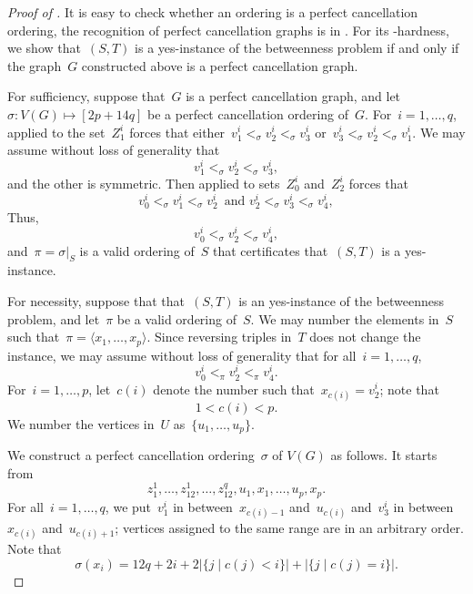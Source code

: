\documentclass[a4paper,cleveref, autoref, 11pt, fleqn, thm-restate]{article}
\theoremstyle{plain}
\begin{document}
\begin{proof}[Proof of ]
  It is easy to check whether an ordering is a perfect cancellation ordering, the recognition of perfect cancellation graphs is in \NP.  For its \NP-hardness, we show that~$(S, T)$ is a yes-instance of the betweenness problem if and only if the graph~$G$ constructed above is a perfect cancellation graph.

  For sufficiency, suppose that~$G$ is a perfect cancellation graph, and let~$\sigma: V(G)\mapsto [2 p + 14 q]$ be a perfect cancellation ordering of~$G$.
  For~$i = 1, \ldots, q$,  applied to the set~$Z^{i}_{1}$ forces that
  either~$v^{i}_{1} <_\sigma v^{i}_{2} <_\sigma v^{i}_{3}$ or~$v^{i}_{3} <_\sigma v^{i}_{2} <_\sigma v^{i}_{1}$.
  We may assume without loss of generality that
  \[
    v^{i}_{1} <_\sigma v^{i}_{2} <_\sigma v^{i}_{3},
  \]
  and the other is symmetric.
  Then  applied to sets~$Z^{i}_{0}$ and~$Z^{i}_{2}$ forces that
  \[
    v^{i}_{0} <_\sigma v^{i}_{1} <_\sigma v^{i}_{2}
    \,\text{  and } v^{i}_{2} <_\sigma v^{i}_{3} <_\sigma v^{i}_{4},
  \]
  Thus, %
  \[
    v^{i}_{0} <_\sigma v^{i}_{2} <_\sigma v^{i}_{4},
  \]
  and~$\pi = \sigma|_{S}$ is a valid ordering of~$S$ that certificates that~$(S, T)$ is a yes-instance.

  For necessity, suppose that that~$(S, T)$ is an yes-instance of the betweenness problem, and let~$\pi$ be a valid ordering of~$S$.
  We may number the elements in~$S$ such that~$\pi = \langle x_{1}, \ldots, x_{p} \rangle$.
  Since reversing triples in~$T$ does not change the instance, we may assume without loss of generality that for all~$i = 1, \ldots, q$,
  \[
    v_{0}^{i} <_\pi v_{2}^{i}<_\pi v_{4}^{i}.
  \]
  For~$i = 1, \ldots, p$, let~$c(i)$ denote the number such that~$x_{c(i)} = v_{2}^{i}$; note that
  \[
    1 < c(i) < p.
  \]
  We number the vertices in~$U$ as~$\{u_{1}, \ldots, u_{p}\}$.  %

  We construct a perfect cancellation ordering~$\sigma$ of $V(G)$ as follows.
  It starts from
  \[
    z_{1}^{1}, \ldots, z_{12}^{1}, \ldots, z_{12}^{q}, u_{1}, x_{1}, \ldots, u_{p}, x_{p}.
  \]
  For all~$i = 1, \ldots, q$, we put~$v_{1}^{i}$ in between~$x_{c(i)-1}$ and~$u_{c(i)}$ and~$v_{3}^{i}$ in between~$x_{c(i)}$ and~$u_{c(i)+1}$; vertices assigned to the same range are in an arbitrary order.
  Note that
  \[
    \sigma(x_{i}) = 12 q + 2 i + 2 |\{j\mid c(j) < i\}| + |\{j\mid c(j) = i\}|.
  \]


\end{proof}
\end{document}
